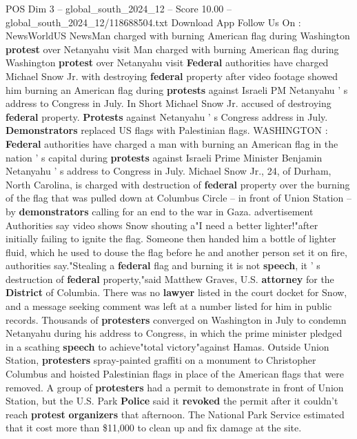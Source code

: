 \begin{textsample}{POS Dim 3 – global\_south\_2024\_12 – Score 10.00 – global\_south\_2024\_12/118688504.txt}  \label{ex:f3_pos_389}
Download App Follow Us On : NewsWorldUS NewsMan charged with burning American flag during Washington \textbf{protest} over Netanyahu visit Man charged with burning American flag during Washington \textbf{protest} over Netanyahu visit \textbf{Federal} authorities have charged Michael Snow Jr. with destroying \textbf{federal} property after video footage showed him burning an American flag during \textbf{protests} against Israeli PM Netanyahu ' s address to Congress in July.
In Short Michael Snow Jr. accused of destroying \textbf{federal} property. \textbf{Protests} against Netanyahu ' s Congress address in July. \textbf{Demonstrators} replaced US flags with Palestinian flags.
WASHINGTON : \textbf{Federal} authorities have charged a man with burning an American flag in the nation ' s capital during \textbf{protests} against Israeli Prime Minister Benjamin Netanyahu ' s address to Congress in July.
Michael Snow Jr., 24, of Durham, North Carolina, is charged with destruction of \textbf{federal} property over the burning of the flag that was pulled down at Columbus Circle -- in front of Union Station -- by \textbf{demonstrators} calling for an end to the war in Gaza. advertisement Authorities say video shows Snow shouting a"I need a better lighter!"after initially failing to ignite the flag.
Someone then handed him a bottle of lighter fluid, which he used to douse the flag before he and another person set it on fire, authorities say."Stealing a \textbf{federal} flag and burning it is not \textbf{speech}, it ' s destruction of \textbf{federal} property,"said Matthew Graves, U.S. \textbf{attorney} for the \textbf{District} of Columbia.
There was no \textbf{lawyer} listed in the court docket for Snow, and a message seeking comment was left at a number listed for him in public records.
Thousands of \textbf{protesters} converged on Washington in July to condemn Netanyahu during his address to Congress, in which the prime minister pledged in a scathing \textbf{speech} to achieve"total victory"against Hamas.
Outside Union Station, \textbf{protesters} spray-painted graffiti on a monument to Christopher Columbus and hoisted Palestinian flags in place of the American flags that were removed.
A group of \textbf{protesters} had a permit to demonstrate in front of Union Station, but the U.S.
Park \textbf{Police} said it \textbf{revoked} the permit after it couldn't reach \textbf{protest} \textbf{organizers} that afternoon.
The National Park Service estimated that it cost more than \$11,000 to clean up and fix damage at the site.

\end{textsample}
